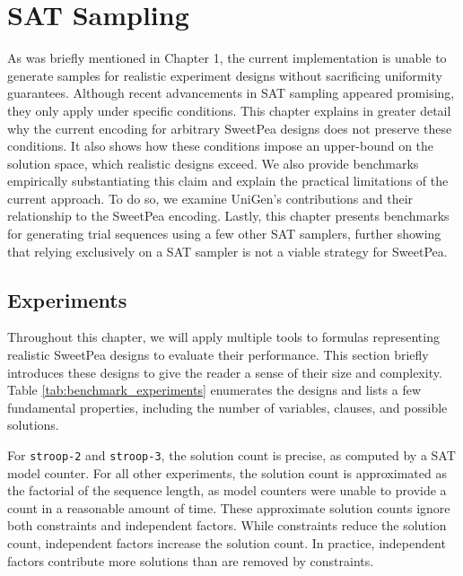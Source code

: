 
\chapter{SAT Sampling}

As was briefly mentioned in Chapter 1, the current implementation is unable to generate samples for realistic experiment designs without sacrificing uniformity guarantees. Although recent advancements in SAT sampling appeared promising, they only apply under specific conditions. This chapter explains in greater detail why the current encoding for arbitrary SweetPea designs does not preserve these conditions. It also shows how these conditions impose an upper-bound on the solution space, which realistic designs exceed. We also provide benchmarks empirically substantiating this claim and explain the practical limitations of the current approach. To do so, we examine UniGen's contributions and their relationship to the SweetPea encoding. Lastly, this chapter presents benchmarks for generating trial sequences using a few other SAT samplers, further showing that relying exclusively on a SAT sampler is not a viable strategy for SweetPea.


\section{Experiments}

Throughout this chapter, we will apply multiple tools to formulas representing realistic SweetPea designs to evaluate their performance. This section briefly introduces these designs to give the reader a sense of their size and complexity. Table \ref{tab:benchmark_experiments} enumerates the designs and lists a few fundamental properties, including the number of variables, clauses, and possible solutions.

For \texttt{stroop-2} and \texttt{stroop-3}, the solution count is precise, as computed by a SAT model counter. For all other experiments, the solution count is approximated as the factorial of the sequence length, as model counters were unable to provide a count in a reasonable amount of time. These approximate solution counts ignore both constraints and independent factors. While constraints reduce the solution count, independent factors increase the solution count. In practice, independent factors contribute more solutions than are removed by constraints.

